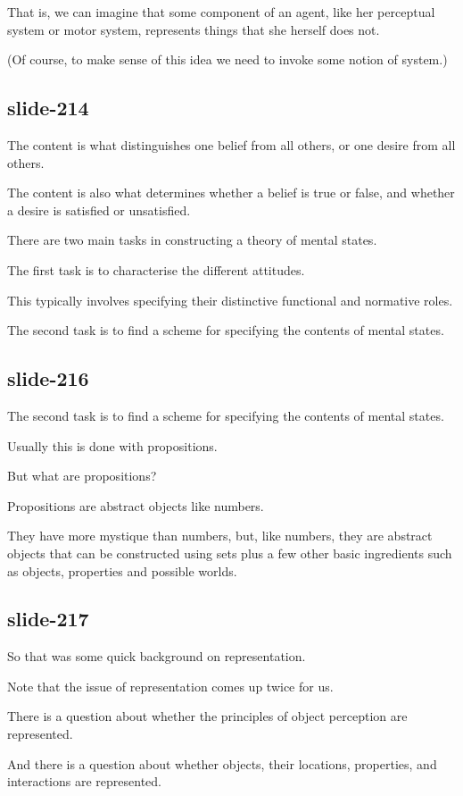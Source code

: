 \documentclass[12pt,\papersize]{extarticle}
\begin{document}
That is, we can imagine that some component of an agent, like her perceptual system or motor system, represents things that she herself does not.
 
(Of course, to make sense of this idea we need to invoke some notion of system.)
 
\subsection{slide-214}
The content is what distinguishes one belief from all others, or one desire from all others.
 
The content is also what determines whether a belief is true or false, and whether a desire is satisfied or unsatisfied.
 
There are two main tasks in constructing a theory of mental states.
 
The first task is to characterise the different attitudes.
 
This typically involves specifying their distinctive functional and normative roles.
 
The second task is to find a scheme for specifying the contents of mental states.
 
\subsection{slide-216}
The second task is to find a scheme for specifying the contents of mental states.
 
Usually this is done with propositions.
 
But what are propositions?
 
Propositions are abstract objects like numbers.
 
They have more mystique than numbers, but, like numbers, they are abstract objects that can be constructed using sets plus a few other basic ingredients such as objects, properties and possible worlds.
 
\subsection{slide-217}
So that was some quick background on representation.
 
Note that the issue of representation comes up twice for us.
 
There is a question about whether the principles of object perception are represented.
 
And there is a question about whether objects, their locations, properties, and interactions are represented.
 
\end{document}
